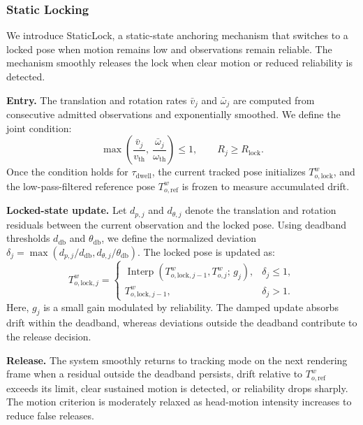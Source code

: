 \documentclass[review]{vgtc}
\begin{document}
\subsubsection{Static Locking}\label{sec:staticlock}

We introduce StaticLock, a static-state anchoring mechanism that switches to a locked pose when motion remains low and observations remain reliable. The mechanism smoothly releases the lock when clear motion or reduced reliability is detected.

\textbf{Entry.}
The translation and rotation rates $\bar v_j$ and $\bar\omega_j$ are computed from consecutive admitted observations and exponentially smoothed. We define the joint condition:
\begin{equation}
\max\left(\frac{\bar{v}_j}{v_{\mathrm{th}}},\ \frac{\bar{\omega}_j}{\omega_{\mathrm{th}}}\right) \leq 1, \qquad R_j \geq R_{\mathrm{lock}}.
\label{eq:lock-entry}
\end{equation}
Once the condition holds for $\tau_{\mathrm{dwell}}$, the current tracked pose initializes $T_{o,\mathrm{lock}}^w$, and the low-pass-filtered reference pose $T_{o,\mathrm{ref}}^w$ is frozen to measure accumulated drift.

\textbf{Locked-state update.}
Let $d_{p,j}$ and $d_{\theta,j}$ denote the translation and rotation residuals between the current observation and the locked pose. Using deadband thresholds $d_{\mathrm{db}}$ and $\theta_{\mathrm{db}}$, we define the normalized deviation $\delta_j=\max(d_{p,j}/d_{\mathrm{db}},d_{\theta,j}/\theta_{\mathrm{db}})$. The locked pose is updated as:
\begin{equation}
T_{o,\mathrm{lock},j}^w =
\begin{cases}
\operatorname{Interp}\left(T_{o,\mathrm{lock},j-1}^w, T_{o,j}^{w};\, g_j\right), & \delta_j \leq 1, \\
T_{o,\mathrm{lock},j-1}^w, & \delta_j > 1.
\end{cases}
\label{eq:lock-update}
\end{equation}
Here, $g_j$ is a small gain modulated by reliability. The damped update absorbs drift within the deadband, whereas deviations outside the deadband contribute to the release decision.

\textbf{Release.}
The system smoothly returns to tracking mode on the next rendering frame when a residual outside the deadband persists, drift relative to $T_{o,\mathrm{ref}}^w$ exceeds its limit, clear sustained motion is detected, or reliability drops sharply. The motion criterion is moderately relaxed as head-motion intensity increases to reduce false releases.
\end{document}
